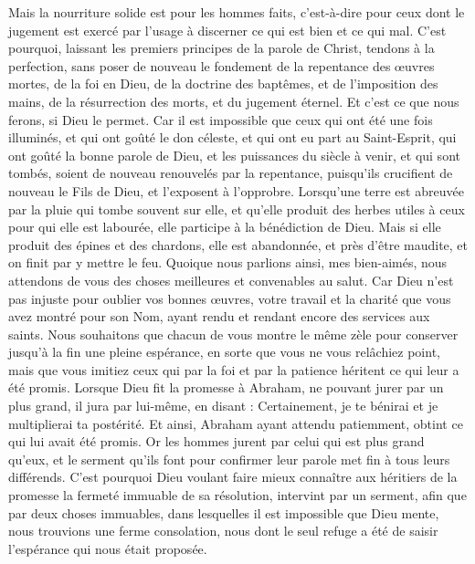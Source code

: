 \begin{multicols}{2}
Mais la nourriture solide est pour les hommes faits, c'est-à-dire pour ceux dont le jugement est exercé par l’usage à discerner ce qui est bien et ce qui mal.
\VerseOne{}C'est pourquoi, laissant les premiers principes de la parole de Christ, tendons à la perfection, sans poser de nouveau le fondement de la repentance des œuvres mortes,
de la foi en Dieu, de la doctrine des baptêmes, et de l'imposition des mains, de la résurrection des morts, et du jugement éternel.
Et c'est ce que nous ferons, si Dieu le permet.
Car il est impossible que ceux qui ont été une fois illuminés, et qui ont goûté le don céleste, et qui ont eu part au Saint-Esprit,
qui ont goûté la bonne parole de Dieu, et les puissances du siècle à venir,
et qui sont tombés, soient de nouveau renouvelés par la repentance, puisqu’ils crucifient de nouveau le Fils de Dieu, et l'exposent à l'opprobre.
Lorsqu’une terre est abreuvée par la pluie qui tombe souvent sur elle, et qu’elle produit des herbes utiles à ceux pour qui elle est labourée, elle participe à la bénédiction de Dieu.
Mais si elle produit des épines et des chardons, elle est abandonnée, et près d’être maudite, et on finit par y mettre le feu.
Quoique nous parlions ainsi, mes bien-aimés, nous attendons de vous des choses meilleures et convenables au salut.
Car Dieu n'est pas injuste pour oublier vos bonnes œuvres, votre travail et la charité que vous avez montré pour son Nom, ayant rendu et rendant encore des services aux saints.
Nous souhaitons que chacun de vous montre le même zèle pour conserver jusqu'à la fin une pleine espérance,
en sorte que vous ne vous relâchiez point, mais que vous imitiez ceux qui par la foi et par la patience héritent ce qui leur a été promis.
Lorsque Dieu fit la promesse à Abraham, ne pouvant jurer par un plus grand, il jura par lui-même,
en disant : Certainement, je te bénirai et je multiplierai ta postérité.
Et ainsi, Abraham ayant attendu patiemment, obtint ce qui lui avait été promis.
Or les hommes jurent par celui qui est plus grand qu'eux, et le serment qu'ils font pour confirmer leur parole met fin à tous leurs différends.
C'est pourquoi Dieu voulant faire mieux connaître aux héritiers de la promesse la fermeté immuable de sa résolution, intervint par un serment,
afin que par deux choses immuables, dans lesquelles il est impossible que Dieu mente, nous trouvions une ferme consolation, nous dont le seul refuge a été de saisir l'espérance qui nous était proposée.

\end{multicols}
